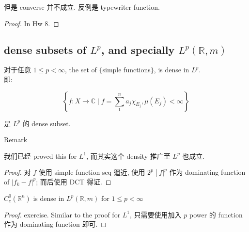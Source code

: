 但是 converse 并不成立. 反例是 typewriter function.

\begin{proof}

In Hw 8.

\end{proof}

\subsection{\texorpdfstring{dense subsets of \(L^{p}\), and specially \(L^{p}(\mathbb{R},m)\)}{dense subsets of L\^{}\{p\}, and specially L\^{}\{p\}(\textbackslash mathbb\{R\},m)}}\label{dense-subsets-of-lp-and-specially-lpmathbbrm}

\begin{proposition}

对于任意 \(1 \leq p < \infty\), the set of \(\{\)simple functions\(\}\), is dense in \(L^{p}\).\\
即:

\[\left\{ {f:X\rightarrow\mathbb{C} \mid f = \sum\limits_{1}^{n}a_{j}\chi_{E_{j}},\mu(E_{j}) < \infty} \right\}\]

是 \(L^{p}\) 的 dense subset.

\end{proposition}

\begin{qlremark}{Remark}

我们已经 proved this for \(L^{1}\), 而其实这个 density 推广至 \(L^{p}\) 也成立.

\end{qlremark}

\begin{proof}

对 \(f\) 使用 simple function seq 逼近, 使用 \(\left. 2^{p} \middle| f|^{p} \right.\) 作为 dominating function of \(|f_{k} - f|^{p}\); 而后使用 DCT 得证.

\end{proof}

\begin{theorem}{}

\(C_{c}^{0}(\mathbb{R}^{n})\) is dense in \(L^{p}(\mathbb{R},m)\) for \(1 \leq p < \infty\)

\end{theorem}

\begin{proof}

exercise. Similar to the proof for \(L^{1}\), 只需要使用加入 \(p\) power 的 function 作为 dominating function 即可.

\end{proof}

